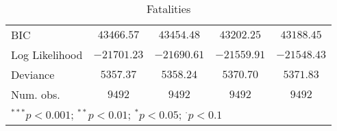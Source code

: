 \begin{sidewaystable}
\begin{center}
{\begin{tabular}{l c c c c}
BIC             & $43466.57$    & $43454.48$    & $43202.25$    & $43188.45$    \\
Log Likelihood  & $-21701.23$   & $-21690.61$   & $-21559.91$   & $-21548.43$   \\
Deviance        & $5357.37$     & $5358.24$     & $5370.70$     & $5371.83$     \\
Num. obs.       & $9492$        & $9492$        & $9492$        & $9492$        \\
\hline
\multicolumn{5}{l}{\scriptsize{$^{***}p<0.001$; $^{**}p<0.01$; $^{*}p<0.05$; $^{\cdot}p<0.1$}}
\end{tabular}
}
\caption{Fatalities}
\label{deaths}
\end{center}
\end{sidewaystable}
